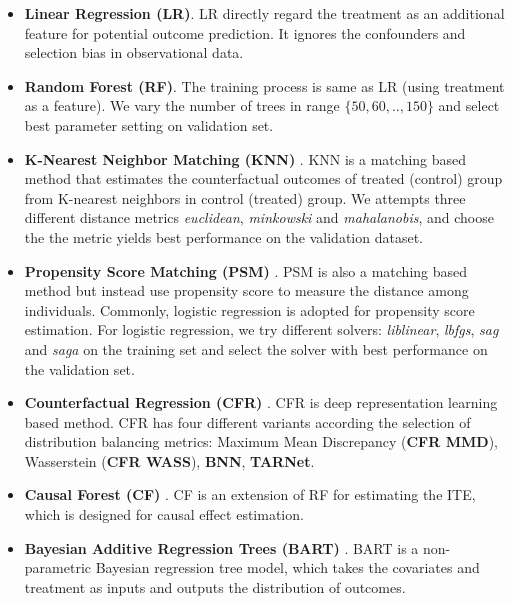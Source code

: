 \begin{itemize}[leftmargin=*]
    \item \textbf{Linear Regression (LR)}. LR directly regard the treatment as an additional feature for potential outcome prediction. It ignores the confounders and selection bias in observational data.
    \item \textbf{Random Forest (RF)}. The training process is same as LR (using treatment as a feature). We vary the number of trees in range $\{50,60,..,150\}$ and select best parameter setting on validation set. 
    \item \textbf{K-Nearest Neighbor Matching (KNN)} \cite{crump2008nonparametric}. KNN is a matching based method that estimates the counterfactual outcomes of treated (control) group from K-nearest neighbors in control (treated) group. We attempts three different distance metrics \textit{euclidean}, \textit{minkowski} and \textit{mahalanobis}, and choose the the metric yields best performance on the validation dataset.  
    \item \textbf{Propensity Score Matching (PSM)} \cite{rosenbaum1983central}. PSM is also a matching based method but instead use propensity score to measure the distance among individuals. Commonly, logistic regression is adopted for propensity score estimation. For logistic regression, we try different solvers: \textit{liblinear}, \textit{lbfgs}, \textit{sag} and \textit{saga} on the training set and select the solver with best performance on the validation set.
    \item \textbf{Counterfactual Regression (CFR)} \cite{johansson2016learning,shalit2017estimating}. CFR is deep representation learning based method. CFR has four different variants according the selection of distribution balancing metrics: Maximum Mean Discrepancy (\textbf{CFR MMD}), Wasserstein (\textbf{CFR WASS}), \textbf{BNN}, \textbf{TARNet}.
    \item \textbf{Causal Forest (CF)} \cite{wager2018estimation}. CF is an extension of RF for estimating the ITE, which is designed for causal effect estimation.
    \item \textbf{Bayesian Additive Regression Trees (BART)} \cite{hill2011bayesian}. BART is a non-parametric Bayesian regression tree model, which takes the covariates and treatment as inputs and outputs the distribution of outcomes. 
\end{itemize}

